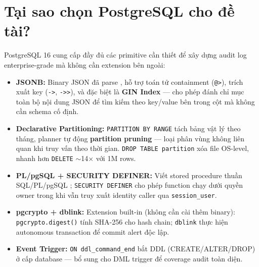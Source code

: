 \section{Tại sao chọn PostgreSQL cho đề tài?}

PostgreSQL 16 cung cấp đầy đủ các primitive cần thiết để xây dựng audit log enterprise-grade mà không cần extension bên ngoài:

\begin{sloppypar}
\begin{itemize}
    \item \textbf{JSONB:} Binary JSON đã parse \cite{PG16JSONB}, hỗ trợ toán tử containment (\texttt{@>}), trích xuất key (\texttt{->}, \texttt{->>}), và đặc biệt là \textbf{GIN Index} \cite{PG16GIN} --- cho phép đánh chỉ mục toàn bộ nội dung JSON để tìm kiếm theo key/value bên trong cột mà không cần schema cố định.
    \item \textbf{Declarative Partitioning:} \texttt{PARTITION\allowbreak{} BY\allowbreak{} RANGE} \cite{PG16Partitioning} tách bảng vật lý theo tháng, planner tự động \textbf{partition pruning} --- loại phân vùng không liên quan khi truy vấn theo thời gian. \texttt{DROP\allowbreak{} TABLE\allowbreak{} partition} xóa file OS-level, nhanh hơn \texttt{DELETE} $\sim$14$\times$ với 1M rows.
    \item \textbf{PL/pgSQL + SECURITY DEFINER:} Viết stored procedure thuần SQL/PL/pgSQL \cite{PG16Triggers}; \texttt{SECURITY\allowbreak{} DEFINER} cho phép function chạy dưới quyền owner trong khi vẫn truy xuất identity caller qua \texttt{session\_user}.
    \item \textbf{pgcrypto + dblink:} Extension built-in (không cần cài thêm binary): \texttt{pgcrypto\allowbreak{}.digest()} tính SHA-256 cho hash chain; \texttt{dblink} thực hiện autonomous transaction để commit alert độc lập.
    \item \textbf{Event Trigger:} \texttt{ON\allowbreak{} ddl\_\allowbreak{}command\_\allowbreak{}end} bắt DDL (CREATE/ALTER/DROP) ở cấp database --- bổ sung cho DML trigger để coverage audit toàn diện.
\end{itemize}
\end{sloppypar}
